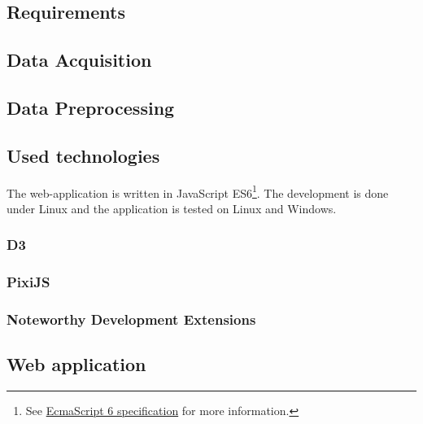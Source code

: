 \subsection{Requirements}


\subsection{Data Acquisition}
\label{s:data-acquisition}


\subsection{Data Preprocessing}
\label{s:data-preprocessing}


\subsection{Used technologies}
The web-application is written in JavaScript ES6\footnote{See \href{http://www.ecma-international.org/ecma-262/6.0/}{EcmaScript 6 specification} for more information.}. The development is done under Linux and the application is tested on Linux and Windows.

\subsubsection{D3}


\subsubsection{PixiJS}


\subsubsection{Noteworthy Development Extensions}


\subsection{Web application}
\label{s:web-application}

